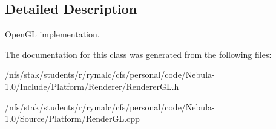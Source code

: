 \subsection{Detailed Description}
OpenGL implementation. 

The documentation for this class was generated from the following files:\begin{DoxyCompactItemize}
\item 
/nfs/stak/students/r/rymalc/cfs/personal/code/Nebula-\/1.0/Include/Platform/Renderer/RendererGL.h\item 
/nfs/stak/students/r/rymalc/cfs/personal/code/Nebula-\/1.0/Source/Platform/RenderGL.cpp\end{DoxyCompactItemize}
